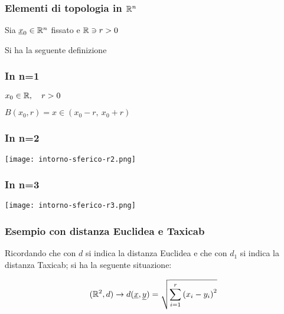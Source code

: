 \pagebreak{}

\subsubsection{Elementi di topologia in \texorpdfstring{\(\mathbb{R}^{n} \)}{Rn}}

Sia \(\underline{x}_0 \in \mathbb{R}^{n} \) fissato e \(\mathbb{R} \ni r>0\)

Si ha la seguente definizione


\subsubsection*{In n=1}

\(x_0 \in \mathbb{R}, \quad r > 0\)

\(B(x_{0},r) = x \in \left( x_0-r,\ x_0+r \right)\)

\subsubsection*{In n=2}

\begin{center}
    \texttt{[image: intorno-sferico-r2.png]}
\end{center}

\subsubsection*{In n=3}

\begin{center}
    \texttt{[image: intorno-sferico-r3.png]}
\end{center}

\filbreak{}

\subsubsection*{Esempio con distanza Euclidea e Taxicab}

Ricordando che con \(d\) si indica la distanza Euclidea e che con \(d_1\) si indica la distanza Taxicab; si ha la seguente situazione:

\[
    (\mathbb{R}^{2},d) \rightarrow d(\underline{x},\underline{y}) = \sqrt{\sum^{r}_{i=1} {(x_i-y_i)}^2}
\]

